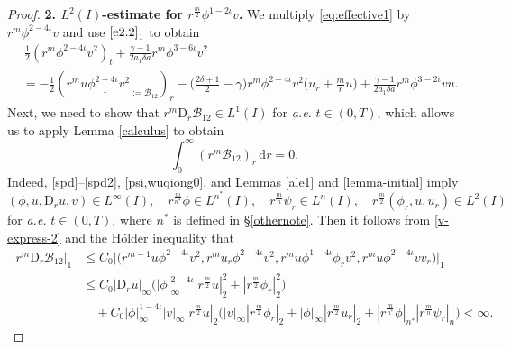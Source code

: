 \documentclass[11pt,reqno]{amsart}
\numberwithin{rk}{section}
\numberwithin{prop}{section}
\numberwithin{mydef}{section}
\numberwithin{lem}{section}
\numberwithin{equation}{section}
\numberwithin{thm}{section}
\begin{document}
\begin{proof}
\smallskip
\textbf{2. $L^2(I)$-estimate for $r^\frac{m}{2}\phi^{1-2\iota} v$.}  We multiply \eqref{eq:effective1} by $r^m\phi^{2-4\iota}v$ and use $\eqref{e2.2}_1$ to obtain
\begin{equation}\label{b8pre}
\begin{aligned}
&\,\frac{1}{2} (r^m \phi^{2-4\iota}v^2)_t+\frac{\gamma-1}{2a_1\delta a}r^m \phi^{3-6\iota} v^2\\
&=-\frac{1}{2}(r^m \underline{u\phi^{2-4\iota}v^2}_{:=\mathcal{B}_{12}})_r-\big(\frac{2\delta+1}{2}-\gamma\big)r^m\phi^{2-4\iota}v^2\big(u_r+\frac{m}{r}u\big)+\frac{\gamma-1}{2a_1\delta a}r^m \phi^{3-2\iota} vu.
\end{aligned}
\end{equation}
Next, we need to  show that $r^m \mathrm{D}_r\mathcal{B}_{12} \in L^1(I)$  for {\it a.e.} $t\in (0,T)$, which allows us to apply Lemma \ref{calculus} to obtain
\begin{equation}\label{eq:B8}
\int_0^\infty (r^m\mathcal{B}_{12})_r\,\mathrm{d}r=0.
\end{equation}
Indeed,  \eqref{spd}--\eqref{spd2}, \eqref{psi,wuqiong0}, and Lemmas \ref{ale1} and \ref{lemma-initial} imply 
\begin{equation*}
(\phi, u, \mathrm{D}_ru,v)\in L^\infty(I),\quad r^\frac{m}{n^*}\phi\in L^{n^*}(I),\quad r^\frac{m}{n}\psi_{r}\in L^n(I),\quad  
r^\frac{m}{2}(\phi_r,u,u_r)\in L^2(I)
\end{equation*}
for {\it a.e.} $t\in (0,T)$, where $n^*$ is defined in \S\ref{othernote}. Then it follows from \eqref{v-express-2} and the H\"older inequality that
\begin{equation*}
\begin{aligned}
|r^m \mathrm{D}_r\mathcal{B}_{12}|_1&\leq C_0\big|\big(r^{m-1}u\phi^{2-4\iota} v^2,r^m u_r\phi^{2-4\iota} v^2,r^m u\phi^{1-4\iota} \phi_r v^2,r^{m}u\phi^{2-4\iota} vv_r\big)\big|_1\\
&\leq C_0|\mathrm{D}_r u|_\infty\big(|\phi|_\infty^{2-4\iota}|r^\frac{m}{2}u|_2^2+ |r^\frac{m}{2}\phi_r|_2^2\big)\\
&\quad +C_0|\phi|_\infty^{1-4\iota}|v|_\infty |r^\frac{m}{2}u|_2\big(|v|_\infty|r^\frac{m}{2}\phi_r|_2+|\phi|_\infty |r^\frac{m}{2}u_r|_2+|r^\frac{m}{n^*}\phi|_{n^*} |r^\frac{m}{n}\psi_r|_n\big)<\infty.  
\end{aligned}
\end{equation*} 


\end{proof}
\end{document}
